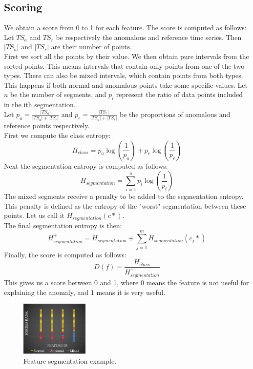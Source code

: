 \documentclass[11pt]{article}
\begin{document}
\subsection{Scoring}
We obtain a score from 0 to 1 for each feature. The score is computed as follows:
Let $TS_a$ and $TS_r$ be respectively the anomalous and reference time series. Then $|TS_a|$ and $|TS_r|$ are their number of points.\\
First we sort all the points by their value. We then obtain pure intervals from the sorted points. This means intervals that contain only points from one of the two types. There can also be mixed intervals, which contain points from both types. This happens if both normal and anomalous points take some specific values. Let $n$ be the number of segments, and $p_i$ represent the ratio of data points included in the ith segmentation.\\
Let $p_a = \frac{|TS_a|}{|TS_a| + |TS_r|}$ and $p_r = \frac{|TS_r|}{|TS_a| + |TS_r|}$ be the proportions of anomalous and reference points respectively.\\
First we compute the class entropy: 
\begin{equation}
    H_{class} = p_a \log(\frac{1}{p_a}) + p_r \log(\frac{1}{p_r})
\end{equation}
Next the segmentation entropy is computed as follows:
\begin{equation}
    H_{segmentation} = \sum_{i=1}^{n} p_i \log(\frac{1}{p_i})
\end{equation}
The mixed segments receive a penalty to be added to the segmentation entropy. This penalty is defined as the entropy of the "worst" segmentation between these points. Let us call it $H_{segmentation}(c*)$.\\
The final segmentation entropy is then:
\begin{equation}
    H_{segmentation}^{+} = H_{segmentation} + \sum_{j=1}^{m} H_{segmentation}(c_j*)
\end{equation}
Finally, the score is computed as follows:
\begin{equation}
    D(f) = \frac{H_{class} }{H_{segmentation}^{+}}
\end{equation}
This gives us a score between 0 and 1, where 0 means the feature is not useful for explaining the anomaly, and 1 means it is very useful.

\begin{figure}[h!]
    \centering
    \includegraphics[width=0.3\textwidth]{images/exstreamplot.png}  %
    \caption{Feature segmentation example.}
    \label{fig:exstream_segments}
\end{figure}
\end{document}
